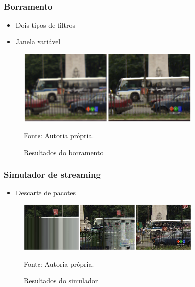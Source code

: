	\begin{frame}\frametitle{Borramento}
		\begin{itemize}
			\item Dois tipos de filtros
			\item Janela variável
		\end{itemize}

		\begin{figure}
			\includegraphics[width=0.8\textwidth]{./imgs/blur.png}
			\caption{Resultados do borramento}
			\tiny
			Fonte: Autoria própria.
		\end{figure}

    \end{frame}
	
	\begin{frame}\frametitle{Simulador de streaming}
		\begin{itemize}
			\item Descarte de pacotes
		\end{itemize}

		\begin{figure}
			\includegraphics[width=0.8\textwidth]{./imgs/net.png}
			\caption{Resultados do simulador}
			\tiny
			Fonte: Autoria própria.
		\end{figure}

    \end{frame}
		
